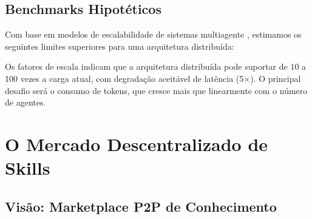 \subsection{Benchmarks Hipotéticos}

Com base em modelos de escalabilidade de sistemas multiagente
\cite{stone2000multiagent}, estimamos os seguintes limites superiores
para uma arquitetura distribuída:

\begin{table}[htb]
\centering
\caption{Benchmarks hipotéticos de escalabilidade}
\label{tab:benchmarks-escala}
\small
\end{table}

\noindent Os fatores de escala indicam que a arquitetura distribuída
pode suportar de 10 a 100 vezes a carga atual, com degradação
aceitável de latência (5$\times$). O principal desafio será o consumo
de tokens, que cresce mais que linearmente com o número de agentes.

\section{O Mercado Descentralizado de Skills}
\label{sec:mercado-skills}
\nivelintermediario

\subsection{Visão: Marketplace P2P de Conhecimento}

